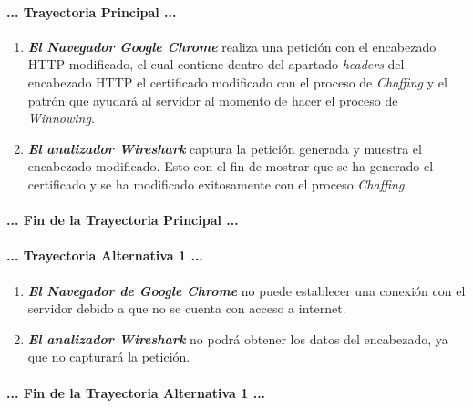 \documentclass[12pt, a4paper, titlepage]{report}
\begin{document}
				\paragraph{... Trayectoria Principal ...}
				\begin{enumerate}
					\item \textbf{\textit{El Navegador Google Chrome}} realiza una petición con el encabezado HTTP modificado, el cual contiene dentro del apartado \textit{headers} del encabezado HTTP el certificado modificado con el proceso de \textit{Chaffing} y el patrón que ayudará al servidor al momento de hacer el proceso de \textit{Winnowing}.
					\item \textbf{\textit{El analizador Wireshark}} captura la petición generada y muestra el encabezado modificado. Esto con el fin de mostrar que se ha generado el certificado y se ha modificado exitosamente con el proceso \textit{Chaffing}.				
					\end{enumerate}
				\paragraph{... Fin de la Trayectoria Principal ...}
				
				\paragraph{... Trayectoria Alternativa 1 ...}
				\begin{enumerate}
					\item \textbf{\textit{El Navegador de Google Chrome}} no puede establecer una conexión con el servidor debido a que no se cuenta con acceso a internet.
					\item \textbf{\textit{El analizador Wireshark}} no podrá obtener los datos del encabezado, ya que no capturará la petición.
				\end{enumerate}
				\paragraph{... Fin de la Trayectoria Alternativa 1 ...}
			
\end{document}
